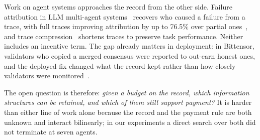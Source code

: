\documentclass[sigconf,anonymous,acmthm=false]{acmart}
\theoremstyle{acmplain}
\theoremstyle{acmdefinition}
\begin{document}
Work on agent systems approaches the record from the other side. Failure attribution in
LLM multi-agent systems~\cite{zhang2025which,zhang2025agentracer,cemri2025fail} recovers who
caused a failure from a trace, with full traces improving attribution by up to 76.5\% over
partial ones~\cite{chen2026elephant}, and trace compression~\cite{hong2026trace,lin2026tracer}
shortens traces to preserve task performance. Neither includes an incentive term. The gap
already matters in deployment: in Bittensor, validators who copied a merged consensus were
reported to out-earn honest ones, and the deployed fix changed what the record kept rather
than how closely validators were
monitored~\cite{opentensor2024weightcopy,liu2024bittensor,opentensor2025commit}.

The open question is therefore: \emph{given a budget on the record, which information
structures can be retained, and which of them still support payment?} It is harder than
either line of work alone because the record and the payment rule are both unknown and
interact bilinearly; in our experiments a direct search over both did not terminate at
seven agents.
\end{document}
